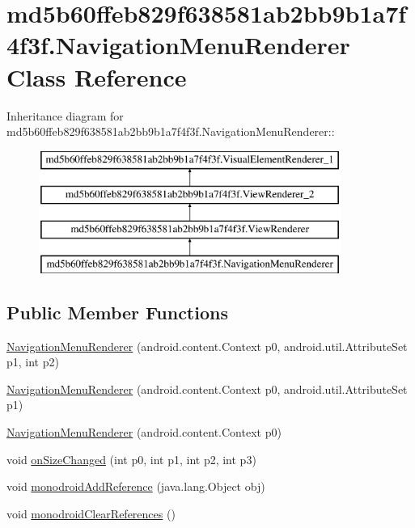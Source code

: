 \hypertarget{classmd5b60ffeb829f638581ab2bb9b1a7f4f3f_1_1_navigation_menu_renderer}{
\section{md5b60ffeb829f638581ab2bb9b1a7f4f3f.NavigationMenuRenderer Class Reference}
\label{classmd5b60ffeb829f638581ab2bb9b1a7f4f3f_1_1_navigation_menu_renderer}
}
Inheritance diagram for md5b60ffeb829f638581ab2bb9b1a7f4f3f.NavigationMenuRenderer::\begin{figure}[H]
\begin{center}
\leavevmode
\includegraphics[height=4cm]{classmd5b60ffeb829f638581ab2bb9b1a7f4f3f_1_1_navigation_menu_renderer}
\end{center}
\end{figure}
\subsection*{Public Member Functions}
\begin{CompactItemize}
\item 
\hyperlink{classmd5b60ffeb829f638581ab2bb9b1a7f4f3f_1_1_navigation_menu_renderer_e74ab61a213bee8a3bbfcd4d6caa561c}{NavigationMenuRenderer} (android.content.Context p0, android.util.AttributeSet p1, int p2)
\item 
\hyperlink{classmd5b60ffeb829f638581ab2bb9b1a7f4f3f_1_1_navigation_menu_renderer_d19d1ffa5f6f7658e40c2aad315f1531}{NavigationMenuRenderer} (android.content.Context p0, android.util.AttributeSet p1)
\item 
\hyperlink{classmd5b60ffeb829f638581ab2bb9b1a7f4f3f_1_1_navigation_menu_renderer_b221cd03a920958ca9a3c7cce213642f}{NavigationMenuRenderer} (android.content.Context p0)
\item 
void \hyperlink{classmd5b60ffeb829f638581ab2bb9b1a7f4f3f_1_1_navigation_menu_renderer_9eb26dd23dc63aa4a5652b61f28def49}{onSizeChanged} (int p0, int p1, int p2, int p3)
\item 
void \hyperlink{classmd5b60ffeb829f638581ab2bb9b1a7f4f3f_1_1_navigation_menu_renderer_28a29aa89bcd264a300fc518ddef9f73}{monodroidAddReference} (java.lang.Object obj)
\item 
void \hyperlink{classmd5b60ffeb829f638581ab2bb9b1a7f4f3f_1_1_navigation_menu_renderer_8d79995c853bf4f40da4f067cd501048}{monodroidClearReferences} ()
\end{CompactItemize}
